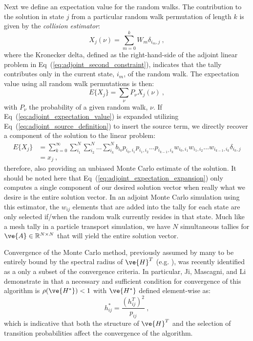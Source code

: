 \documentclass[letterpaper,11pt]{article}
\begin{document}
Next we define an expectation value for the random walks. The
contribution to the solution in state $j$ from a particular random
walk permutation of length $k$ is given by the \textit{collision
  estimator}:
\begin{equation}
  X_{j}(\nu) = \sum_{m=0}^k W_{m} \delta_{i_m,j}\:,
  \label{eq:adjoint_permutation_contribution}
\end{equation}
where the Kronecker delta, defined as the right-hand-side of the
adjoint linear problem in Eq~(\ref{eq:adjoint_second_constraint}),
indicates that the tally contributes only in the current state, $i_m$,
of the random walk. The expectation value using all random walk
permutations is then:
\begin{equation}
  E\{X_j\} = \sum_{\nu} P_{\nu} X_{j}(\nu)\:,
  \label{eq:adjoint_expectation_value}
\end{equation}
with $P_{\nu}$ the probability of a given random walk, $\nu$.  If
Eq~(\ref{eq:adjoint_expectation_value}) is expanded utilizing
Eq~(\ref{eq:adjoint_source_definition}) to insert the source term, we
directly recover a component of the solution to the linear problem:
\begin{equation}
  \begin{split}
    E\{X_j\} &=\sum_{k=0}^{\infty}\sum_{i_1}^{N}\sum_{i_2}^{N}\ldots
    \sum_{i_k}^{N} b_{i_0} p_{i_0,i_1}p_{i_1,i_2}\ldots
    p_{i_{k-1},i_k} w_{i_0,i_1}w_{i_1,i_2}\ldots
    w_{i_{k-1},i_k} \delta_{i_k,j} \\ &= x_{j}\:,
  \end{split}
  \label{eq:adjoint_expectation_expansion}
\end{equation}
therefore, also providing an unbiased Monte Carlo estimate of the
solution. It should be noted here that
Eq~(\ref{eq:adjoint_expectation_expansion}) only computes a single
component of our desired solution vector when really what we desire is
the entire solution vector. In an adjoint Monte Carlo simulation using
this estimator, the $w_{ij}$ elements that are added into the tally
for each state are only selected if/when the random walk currently
resides in that state. Much like a mesh tally in a particle transport
simulation, we have $N$ simultaneous tallies for $\ve{A} \in
\mathbb{R}^{N \times N}$ that will yield the entire solution vector.

Convergence of the Monte Carlo method, previously assumed by many to
be entirely bound by the spectral radius of $\ve{H}^T$
(e.g. \cite{spanier_monte_1969}), was recently identified as a only a
subset of the convergence criteria. In particular, Ji, Mascagni, and
Li demonstrate in \cite{ji_2013} that a necessary and sufficient
condition for convergence of this algorithm is $\rho(\ve{H^*}) < 1$
with $\ve{H^*}$ defined element-wise as:
\begin{equation}
  h^*_{ij} = \frac{(h^T_{ij})^2}{p_{ij}}\:,
  \label{eq:h_star}
\end{equation}
which is indicative that both the structure of $\ve{H}^T$ and the
selection of transition probabilities affect the convergence of the
algorithm.
\end{document}
